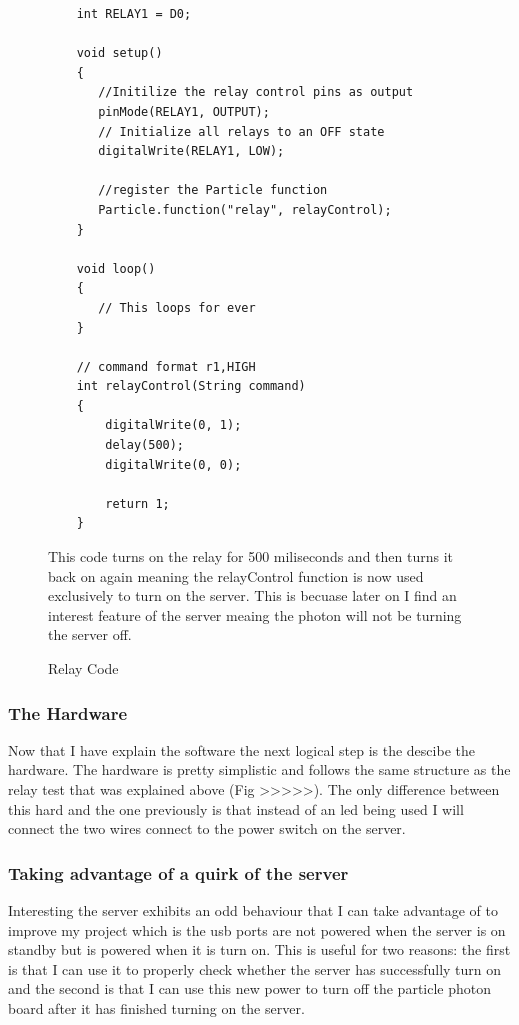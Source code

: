 \documentclass{article}
\begin{document}
\begin{figure}
    \begin{lstlisting}
    int RELAY1 = D0;

    void setup()
    {
       //Initilize the relay control pins as output
       pinMode(RELAY1, OUTPUT);
       // Initialize all relays to an OFF state
       digitalWrite(RELAY1, LOW);

       //register the Particle function
       Particle.function("relay", relayControl);
    }

    void loop()
    {
       // This loops for ever
    }

    // command format r1,HIGH
    int relayControl(String command)
    {
        digitalWrite(0, 1);
        delay(500);
        digitalWrite(0, 0);

        return 1;
    }
    \end{lstlisting}
    \caption{Relay Code} \label{fig:relayCode}
    \vspace{0.5cm}
    This code turns on the relay for 500 miliseconds and then turns it back on again
    meaning the relayControl function is now used exclusively to turn on the server.
    This is becuase later on I find an interest feature of the server meaing the photon
    will not be turning the server off.

\end{figure}

\subsubsection{The Hardware}
Now that I have explain the software the next logical step is the descibe the hardware. The
hardware is pretty simplistic and follows the same structure as the relay test that was
explained above (Fig >>>>>). The only difference between this hard and the one previously
is that instead of an led being used I will connect the two wires connect to the power
switch on the server.


\subsubsection{Taking advantage of a quirk of the server}
Interesting the server exhibits an odd behaviour that I can take advantage of to improve my
project which is the usb ports are not powered when the server is on standby but is powered
when it is turn on. This is useful for two reasons: the first is that I can use it to properly
check whether the server has successfully turn on and the second is that I can use this new
power to turn off the particle photon board after it has finished turning on the server.
\end{document}
